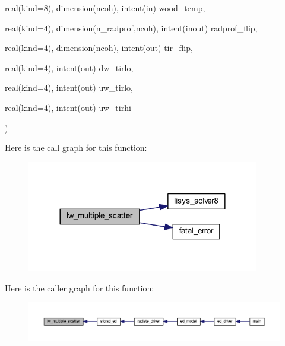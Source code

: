 {\begin{DoxyParamCaption}
\item[{real(kind=8), dimension(ncoh), intent(in)}]{wood\+\_\+temp, }
\item[{real(kind=4), dimension(n\+\_\+radprof,ncoh), intent(inout)}]{radprof\+\_\+flip, }
\item[{real(kind=4), dimension(ncoh), intent(out)}]{tir\+\_\+flip, }
\item[{real(kind=4), intent(out)}]{dw\+\_\+tirlo, }
\item[{real(kind=4), intent(out)}]{uw\+\_\+tirlo, }
\item[{real(kind=4), intent(out)}]{uw\+\_\+tirhi}
\end{DoxyParamCaption}
)}\hypertarget{multiple__scatter_8f90_abda35694b2f8582ddf43bbbe78a8725f}{}\label{multiple__scatter_8f90_abda35694b2f8582ddf43bbbe78a8725f}


Here is the call graph for this function\+:\nopagebreak
\begin{figure}[H]
\begin{center}
\leavevmode
\includegraphics[width=288pt]{multiple__scatter_8f90_abda35694b2f8582ddf43bbbe78a8725f_cgraph}
\end{center}
\end{figure}




Here is the caller graph for this function\+:\nopagebreak
\begin{figure}[H]
\begin{center}
\leavevmode
\includegraphics[width=350pt]{multiple__scatter_8f90_abda35694b2f8582ddf43bbbe78a8725f_icgraph}
\end{center}
\end{figure}


